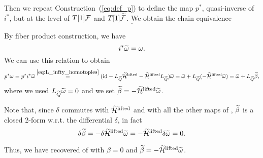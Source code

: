 Then we repeat Construction~(\ref{eq:def_p}) to define the map $p^*$, quasi-inverse of $i^*$, but at the level of $T[1]\mathcal{F}$ and $T[1]\widetilde{\mathcal{F}}$.
We obtain the chain equivalence
\begin{equation}
\label{eq:maps_sketch_proof_part_b}
     .
\end{equation}

By fiber product construction, we have 
\begin{equation*}
    i^* \widetilde{\omega} = \omega .
\end{equation*}
We can use this relation to obtain
\begin{equation*}
    p^* \omega =
    p^* i^* \widetilde{\omega}
    \stackrel{\ref{eq:L_infty_homotopies}}{=}
    (\text{id} - L_{\widetilde{Q}} \widetilde{\mathcal{H}}^\text{lifted} - \widetilde{\mathcal{H}}^\text{lifted} L_{\widetilde{Q}}) \widetilde{\omega} =
    \widetilde{\omega} + L_{\widetilde{Q}} (- \widetilde{\mathcal{H}}^\text{lifted} \widetilde{\omega}) =
    \widetilde{\omega} + L_{\widetilde{Q}} \widetilde{\beta},
\end{equation*}
where we used $L_{\widetilde{Q}} \widetilde{\omega}=0$ and we set $\widetilde{\beta}=- \widetilde{\mathcal{H}}^\text{lifted} \widetilde{\omega}$.

Note that, since $\delta$ commutes with $\widetilde{\mathcal{H}}^\text{lifted}$ and with all the other maps of , $\widetilde{\beta}$ is a closed 2-form w.r.t. the differential $\delta$, in fact
\begin{equation*}
    \delta \widetilde{\beta} = 
    - \delta \widetilde{\mathcal{H}}^\text{lifted} \widetilde{\omega} =
    - \widetilde{\mathcal{H}}^\text{lifted} \delta \widetilde{\omega} =
    0 .
\end{equation*}

Thus, we have recovered  of  with $\beta = 0$ and $\widetilde{\beta}=- \widetilde{\mathcal{H}}^\text{lifted} \widetilde{\omega}$.